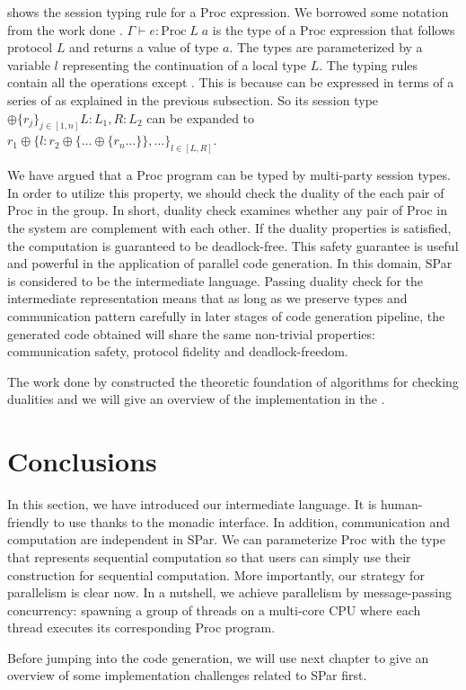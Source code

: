  shows the session typing rule for a Proc expression. We borrowed some notation from the work done \cite{AlgebraicMultipartyProtocol}. $\Gamma \vdash e : \text{Proc} \; L \; a$ is the type of a Proc expression that follows protocol $L$ and returns a value of type $a$. The types are parameterized by a variable $l$ representing the continuation of a local type $L$. The typing rules contain all the operations except . This is because  can be expressed in terms of a series of  as explained in the previous subsection. So its session type $\oplus \{r_j\}_{j \in [1,n]} {L:L_1, R: L_2}$ can be expanded to $r_1 \oplus \{l: r_2 \oplus \{\ldots \oplus\{r_n \ldots\}\},\ldots\}_{l \in [L, R]}$. 

We have argued that a Proc program can be typed by multi-party session types. In order to utilize this property, we should check the duality of the each pair of Proc in the group. In short, duality check examines whether any pair of Proc in the system are complement with each other. If the duality properties is satisfied, the computation is guaranteed to be deadlock-free. This safety guarantee is useful and powerful in the application of parallel code generation. In this domain, SPar is considered to be the intermediate language. Passing duality check for the intermediate representation means that as long as we preserve types and communication pattern carefully in later stages of code generation pipeline, the generated code obtained will share the same non-trivial properties: communication safety, protocol fidelity and deadlock-freedom.

The work done by \cite{coppoGentleIntroductionMultiparty2015} constructed the theoretic foundation of algorithms for checking dualities and we will give an overview of the implementation in the .

\section{Conclusions}
In this section, we have introduced our intermediate language. It is human-friendly to use thanks to the monadic interface. In addition, communication and computation are independent in SPar. We can parameterize Proc with the type that represents sequential computation so that users can simply use their construction for sequential computation. More importantly, our strategy for parallelism is clear now. In a nutshell, we achieve parallelism by message-passing concurrency: spawning a group of threads on a multi-core CPU where each thread executes its corresponding Proc program.

Before jumping into the code generation, we will use next chapter to give an overview of some implementation challenges related to SPar first.